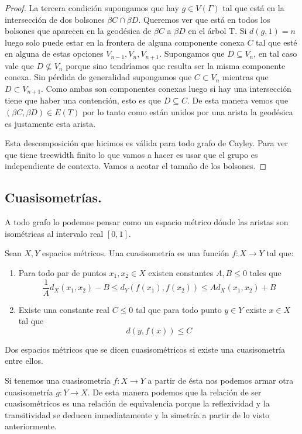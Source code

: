 \documentclass[tesis.tex]{subfiles}
\begin{document}
\begin{proof}
La tercera condición supongamos que hay $g \in V(\Gamma)$ tal que está en la intersección de dos bolsones $\beta C \cap \beta D$. Queremos ver que está en todos los bolsones que aparecen en la geodésica de $\beta C$ a $\beta D$ en el árbol T. Si $d(g,1) = n$ luego solo puede estar en la frontera de alguna componente conexa $C$ tal que esté en alguna de estas opciones  $V_{n-1}, V_{n},  V_{n+1}$. Supongamos que $D \subseteq V_{n}$, en tal caso vale que $D \nsubseteq V_{n}$ porque sino tendríamos que resulta ser la misma componente conexa. Sin pérdida de generalidad supongamos que $C \subset V_n$ mientras que $D \subset V_{n+1}$. Como ambas son componentes conexas luego si hay una intersección tiene que haber una contención, esto es que $D \subseteq C$. De esta manera vemos que $(\beta C, \beta D) \in E(T)$ por lo tanto como están unidos por una arista la geodésica es justamente esta arista.

Esta descomposición que hicimos es válida para todo grafo de Cayley. Para ver que tiene treewidth finito lo que vamos a hacer es usar que el grupo es independiente de contexto. Vamos a acotar el tamaño de los bolsones.

	
\end{proof}


\subsection{Cuasisometrías.}
A todo grafo lo podemos pensar como un espacio métrico dónde las aristas son isométricas al intervalo real $[0,1]$. 


\begin{deff}
	Sean $X,Y$ espacios métricos. Una cuasisometría es una función $f:X \to Y$ tal que:
	\begin{enumerate}
	\item Para todo par de puntos $x_1,x_2 \in X$ existen constantes $A,B \le 0$ tales que
	\[
	\frac{1}{A} d_X(x_1,x_2) - B \le d_Y(f(x_1),f(x_2)) \le A d_X(x_1,x_2) + B
	\]
	\item Existe una constante real $C \le 0$ tal que para todo punto $y \in Y$ existe $x \in X$ tal que 
	\[
	d(y,f(x)) \le C
	\]
	\end{enumerate}
 	Dos espacios métricos que se dicen cuasisométricos si existe una cuasisometría entre ellos.
\end{deff}



Si tenemos una cuasisometría $f:X \to Y$ a partir de ésta nos podemos armar otra cuasisometría $g:Y \to X$. De esta manera podemos que la relación de ser cuasisométricos es una relación de equivalencia porque la reflexividad y la transitividad se deducen inmediatamente y la simetría a partir de lo visto anteriormente.
\end{document}
